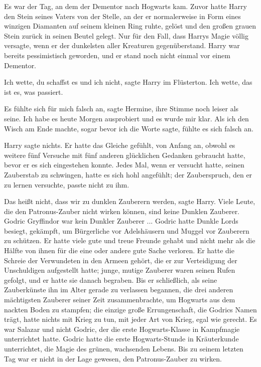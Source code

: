 Es war der Tag, an dem der Dementor nach Hogwarts kam. Zuvor hatte Harry den
Stein seines Vaters von der Stelle, an der er normalerweise in Form eines
winzigen Diamanten auf seinem kleinen Ring ruhte, gelöst und den großen grauen
Stein zurück in seinen Beutel gelegt. Nur für den Fall, dass Harrys Magie völlig
versagte, wenn er der dunkelsten aller Kreaturen gegenüberstand. Harry war
bereits pessimistisch geworden, und er stand noch nicht einmal vor einem
Dementor.

\glqq{}Ich wette, du schaffst es und ich nicht\grqq{}, sagte Harry im Flüsterton.
\glqq{}Ich wette, das ist es, was passiert.\grqq{}

\glqq{}Es fühlte sich für mich falsch an\grqq{}, sagte Hermine, ihre Stimme noch
leiser als seine. \glqq{}Ich habe es heute Morgen ausprobiert und es wurde mir
klar. Als ich den Wisch am Ende machte, sogar bevor ich die Worte sagte, fühlte
es sich falsch an.\grqq{}

Harry sagte nichts. Er hatte das Gleiche gefühlt, von Anfang an, obwohl es
weitere fünf Versuche mit fünf anderen glücklichen Gedanken gebraucht hatte,
bevor er es sich eingestehen konnte. Jedes Mal, wenn er versucht hatte, seinen
Zauberstab zu schwingen, hatte es sich hohl angefühlt; der Zauberspruch, den er
zu lernen versuchte, passte nicht zu ihm.

\glqq{}Das heißt nicht, dass wir zu dunklen Zauberern werden\grqq{}, sagte Harry.
\glqq{}Viele Leute, die den Patronus-Zauber nicht wirken können, sind keine
Dunklen Zauberer. Godric Gryffindor war kein Dunkler Zauberer ...\grqq{} Godric hatte
Dunkle Lords besiegt, gekämpft, um Bürgerliche vor Adelshäusern und Muggel vor
Zauberern zu schützen. Er hatte viele gute und treue Freunde gehabt und nicht
mehr als die Hälfte von ihnen für die eine oder andere gute Sache verloren. Er
hatte die Schreie der Verwundeten in den Armeen gehört, die er zur Verteidigung
der Unschuldigen aufgestellt hatte; junge, mutige Zauberer waren seinen Rufen
gefolgt, und er hatte sie danach begraben. Bis er schließlich, als seine
Zauberkünste ihn im Alter gerade zu verlassen begannen, die drei anderen
mächtigsten Zauberer seiner Zeit zusammenbrachte, um Hogwarts aus dem nackten
Boden zu stampfen; die einzige große Errungenschaft, die Godrics Namen trägt,
hatte nichts mit Krieg zu tun, mit jeder Art von Krieg, egal wie gerecht. Es war
Salazar und nicht Godric, der die erste Hogwarts-Klasse in Kampfmagie
unterrichtet hatte. Godric hatte die erste Hogwarts-Stunde in Kräuterkunde
unterrichtet, die Magie des grünen, wachsenden Lebens. Bis zu seinem letzten Tag
war er nicht in der Lage gewesen, den Patronus-Zauber zu wirken.

